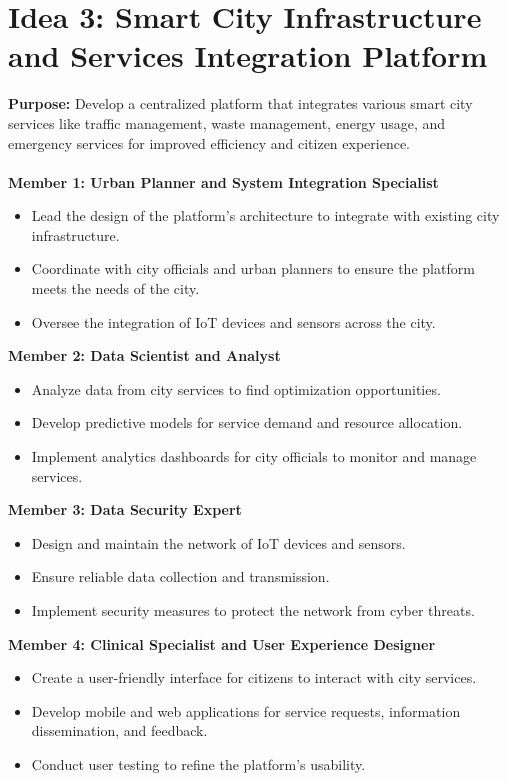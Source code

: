 \documentclass{article}
\begin{document}
\newpage \section{Idea 3: Smart City Infrastructure and Services Integration Platform}
    \textbf{Purpose:} Develop a centralized platform that integrates various smart city services like traffic management, waste management, energy usage, and emergency services for improved efficiency and citizen experience. \\ \\
    \textbf{Member 1: Urban Planner and System Integration Specialist}
        \begin{itemize}
            \item Lead the design of the platform's architecture to integrate with existing city infrastructure.
            \item Coordinate with city officials and urban planners to ensure the platform meets the needs of the city.
            \item Oversee the integration of IoT devices and sensors across the city.
        \end{itemize}
    \textbf{Member 2: Data Scientist and Analyst}
        \begin{itemize}
            \item Analyze data from city services to find optimization opportunities.
            \item Develop predictive models for service demand and resource allocation.
            \item Implement analytics dashboards for city officials to monitor and manage services.
        \end{itemize}
    \textbf{Member 3: Data Security Expert}
        \begin{itemize}
            \item Design and maintain the network of IoT devices and sensors.
            \item Ensure reliable data collection and transmission.
            \item Implement security measures to protect the network from cyber threats.
        \end{itemize}
    \textbf{Member 4: Clinical Specialist and User Experience Designer}
        \begin{itemize}
            \item Create a user-friendly interface for citizens to interact with city services.
            \item Develop mobile and web applications for service requests, information dissemination, and feedback.
            \item Conduct user testing to refine the platform's usability.
        \end{itemize}
\end{document}
